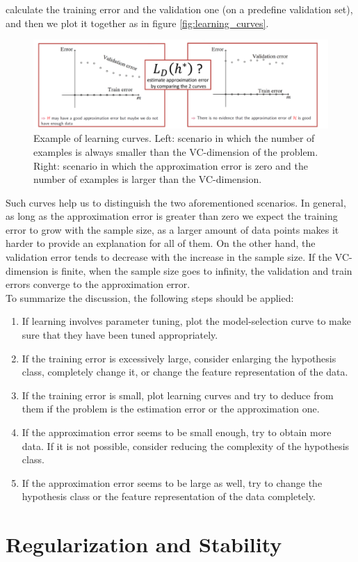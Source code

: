 \documentclass[12pt]{report}
\theoremstyle{plain}
\begin{document}
\begin{flushleft}
calculate the training error and the validation one (on a predefine validation 
set), and then we plot it together as in figure \ref{fig:learning_curves}.
\begin{figure}[!h]
	\centering
	\includegraphics[scale=0.7]{images/learning_curves.pdf}
	\caption{Example of learning curves. Left: scenario in which the number of 
	examples is always smaller than the VC-dimension of the problem. Right: 
	scenario in which the approximation error is zero and the number of 
	examples is larger than the VC-dimension.}
	\label{fig:learning curves}
\end{figure}
Such curves help us to distinguish the two aforementioned scenarios. In 
general, as long as the approximation error is greater than zero we expect the 
training error to grow with the sample size, as a larger amount of data points 
makes it harder to provide an explanation for all of them. On the other hand, 
the validation error tends to decrease with the increase in the sample size. If 
the VC-dimension is finite, when the sample size goes to infinity, the 
validation and train errors converge to the approximation error.\\

To summarize the discussion, the following steps should be applied:
\begin{enumerate}
	\item If learning involves parameter tuning, plot the model-selection curve 
	to make sure that they have been tuned appropriately.
	\item If the training error is excessively large, consider enlarging the 
	hypothesis class, completely change it, or change the feature 
	representation of the data.
	\item If the training error is small, plot learning curves and try to 
	deduce from them if the problem is the estimation error or the 
	approximation one.
	\item If the approximation error seems to be small enough, try to obtain 
	more data. If it is not possible, consider reducing the complexity of the 
	hypothesis class.
	\item If the approximation error seems to be large as well, try to change 
	the hypothesis class or the feature representation of the data completely.
\end{enumerate}


\chapter{Regularization and Stability}
















\end{flushleft}
\end{document}
